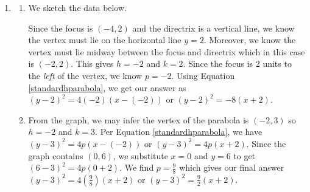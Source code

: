\documentclass{ximera}
\begin{document}
\begin{example}
\begin{explanation}
\begin{enumerate}
\begin{enumerate}
We identify $f(x) =  -2 + 2 \sqrt{2-2x}$ and $g(x) =  -2 - 2 \sqrt{2-2x}$. Since $\sqrt{2-2x} \geq 0$, we see the graph of $f$ traces out the \textit{upper} half of the parabola while the graph of $g$ traces out the \textit{lower} half of the parabola.

\end{enumerate}

\item  

\begin{enumerate}

\item  We sketch the data below.  


\begin{image}
\end{image}

Since the focus is $(-4,2)$ and the directrix is a vertical line, we know the vertex must lie on the horizontal line $y = 2$.  Moreover, we know the vertex must lie midway between the focus and directrix which in this case is  $(-2,2)$.  This gives $h = -2$ and $k = 2$.  Since the focus is $2$ units to the \textit{left} of the vertex, we know $p = -2$.  Using  Equation \ref{standardhparabola}, we get our answer as $(y-2)^2 = 4(-2)(x-(-2))$ or $(y-2)^2 = -8(x+2)$.




\item  From the graph, we may infer the vertex of the parabola is $(-2,3)$ so $h = -2$ and $k = 3$.  Per Equation \ref{standardhparabola}, we have $(y-3)^2 = 4p(x-(-2))$ or $(y-3)^2 = 4p(x+2)$.  Since the graph contains $(0,6)$, we substitute $x=0$ and $y=6$ to get $(6-3)^2 = 4p(0+2)$.  We find $p = \frac{9}{8}$ which gives our final answer $(y-3)^2 = 4\left( \frac{9}{8} \right) (x+2)$ or $(y-3)^2 = \frac{9}{2} (x+2)$. 



\end{enumerate}
\end{enumerate}
\end{explanation}
\end{example}
\end{document}
